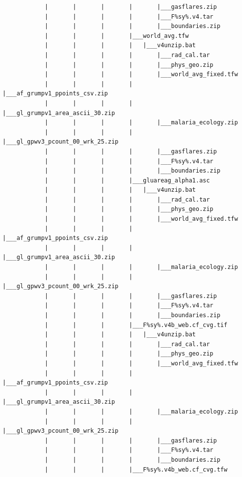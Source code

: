 \documentclass[
]{book}
\begin{document}
\begin{verbatim}
            |       |       |       |       |___gasflares.zip
            |       |       |       |       |___F%sy%.v4.tar
            |       |       |       |       |___boundaries.zip
            |       |       |       |___world_avg.tfw
            |       |       |       |   |___v4unzip.bat
            |       |       |       |       |___rad_cal.tar
            |       |       |       |       |___phys_geo.zip
            |       |       |       |       |___world_avg_fixed.tfw
            |       |       |       |       |___af_grumpv1_ppoints_csv.zip
            |       |       |       |       |___gl_grumpv1_area_ascii_30.zip
            |       |       |       |       |___malaria_ecology.zip
            |       |       |       |       |___gl_gpwv3_pcount_00_wrk_25.zip
            |       |       |       |       |___gasflares.zip
            |       |       |       |       |___F%sy%.v4.tar
            |       |       |       |       |___boundaries.zip
            |       |       |       |___gluareag_alpha1.asc
            |       |       |       |   |___v4unzip.bat
            |       |       |       |       |___rad_cal.tar
            |       |       |       |       |___phys_geo.zip
            |       |       |       |       |___world_avg_fixed.tfw
            |       |       |       |       |___af_grumpv1_ppoints_csv.zip
            |       |       |       |       |___gl_grumpv1_area_ascii_30.zip
            |       |       |       |       |___malaria_ecology.zip
            |       |       |       |       |___gl_gpwv3_pcount_00_wrk_25.zip
            |       |       |       |       |___gasflares.zip
            |       |       |       |       |___F%sy%.v4.tar
            |       |       |       |       |___boundaries.zip
            |       |       |       |___F%sy%.v4b_web.cf_cvg.tif
            |       |       |       |   |___v4unzip.bat
            |       |       |       |       |___rad_cal.tar
            |       |       |       |       |___phys_geo.zip
            |       |       |       |       |___world_avg_fixed.tfw
            |       |       |       |       |___af_grumpv1_ppoints_csv.zip
            |       |       |       |       |___gl_grumpv1_area_ascii_30.zip
            |       |       |       |       |___malaria_ecology.zip
            |       |       |       |       |___gl_gpwv3_pcount_00_wrk_25.zip
            |       |       |       |       |___gasflares.zip
            |       |       |       |       |___F%sy%.v4.tar
            |       |       |       |       |___boundaries.zip
            |       |       |       |___F%sy%.v4b_web.cf_cvg.tfw

\end{verbatim}
\end{document}
